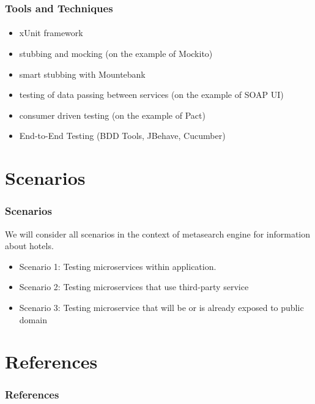 \documentclass{beamer}
\begin{document}
\begin{frame}
	\frametitle{Tools and Techniques}
	\framesubtitle{}
	\begin{itemize}
		\item xUnit framework
		\item stubbing and mocking (on the example of Mockito)
		\item smart stubbing with Mountebank
		\item testing of data passing between services (on the example of SOAP UI)
		\item consumer driven testing (on the example of Pact)
		\item End-to-End Testing (BDD Tools, JBehave, Cucumber)

	\end{itemize}
\end{frame}


\section{Scenarios}
\begin{frame}
	\frametitle{Scenarios}
	We will consider all scenarios in the context of metasearch engine for information about hotels.  
	\begin{itemize}
 		 \item Scenario 1: Testing microservices within application.
		 \item Scenario 2: Testing microservices that use third-party service
		 \item Scenario 3: Testing microservice that will be or is already exposed to public domain
	\end{itemize}
\end{frame}

\section{References}
\begin{frame}
	\frametitle{References}
	\framesubtitle{}

        \nocite{newman,cohn,infosys,clemson,fowler_cont_del,naik}
	
\end{frame}

\end{document}
